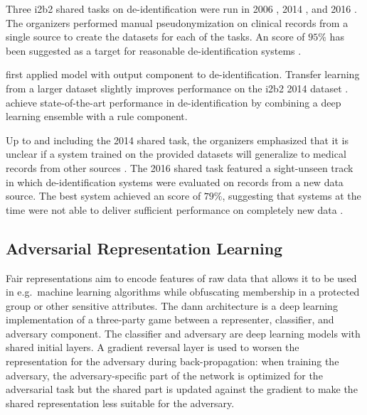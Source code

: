 %
Three i2b2 shared tasks on de-identification were run in 2006 \citep{uzuner2007evaluating}, 2014 \citep{stubbs2015automated}, and 2016 \citep{stubbs2017identification}.
%
The organizers performed manual pseudonymization on clinical records from a single source to create the datasets for each of the tasks.
%
An \fone score of $95\%$ has been suggested as a target for reasonable de-identification systems \citep{stubbs2015automated}.

%
\citet{dernoncourt2017identification} first applied  \citep{hochreiter1997long} model with  output component to de-identification.
%
Transfer learning from a larger dataset slightly improves performance on the i2b2 2014 dataset \citep{lee2018transfer}.
%
\citet{liu2017identification} achieve state-of-the-art performance in de-identification by combining a deep learning ensemble with a rule component.

%
Up to and including the 2014 shared task, the organizers emphasized that it is unclear if a system trained on the provided datasets will generalize to medical records from other sources \citep{uzuner2007evaluating,stubbs2015automated}.
%
The 2016 shared task featured a sight-unseen track in which de-identification systems were evaluated on records from a new data source.
%
The best system achieved an \fone score of $79\%$, suggesting that systems at the time were not able to deliver sufficient performance on completely new data \citep{stubbs2017identification}.

\subsection{Adversarial Representation Learning}
\label{sec:advers-repr-learn}
%
Fair representations \citep{zemel2013learning,hamm2015preserving} aim to encode features of raw data that allows it to be used in e.g.\ machine learning algorithms while obfuscating membership in a protected group or other sensitive attributes.
%
The \ac{dann} architecture \citep{ganin2016domain} is a deep learning implementation of a three-party game between a representer, classifier, and adversary component.
%
The classifier and adversary are deep learning models with shared initial layers.
%
A gradient reversal layer is used to worsen the representation for the adversary during back-propagation: when training the adversary, the adversary-specific part of the network is optimized for the adversarial task but the shared part is updated against the gradient to make the shared representation less suitable for the adversary.

